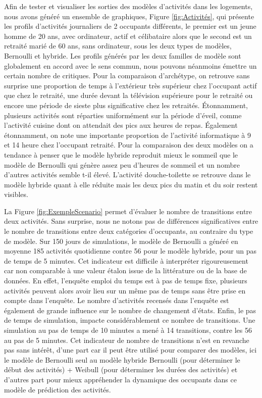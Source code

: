 Afin de tester et visualiser les sorties des modèles d'activités dans les logements, nous avons généré un ensemble de graphiques, Figure \ref{fig:Activités}, qui présente les profils d'activités journaliers de 2 occupants différents, le premier est un jeune homme de 20 ans, avec ordinateur, actif et célibataire alors que le second est un retraité marié de 60 ans, sans ordinateur, sous les deux types de modèles, Bernoulli et hybride. Les profils générés par les deux familles de modèle sont globalement en accord avec le sens commun, nous pouvons néanmoins émettre un certain nombre de critiques. Pour la comparaison d'archétype, on retrouve sans surprise une proportion de temps à l'extérieur très supérieur chez l'occupant actif que chez le retraité, une durée devant la télévision supérieure pour le retraité ou encore une période de sieste plus significative chez les retraités. Étonnamment, plusieurs activités sont réparties uniformément sur la période d'éveil, comme l'activité cuisine dont on attendait des pics aux heures de repas. Également étonnamment, on note une importante proportion de l'activité informatique à 9 et 14 heure chez l'occupant retraité. Pour la comparaison des deux modèles on a tendance à penser que le modèle hybride reproduit mieux le sommeil que le modèle de Bernoulli qui génère assez peu d'heures de sommeil et un nombre d'autres activités semble t-il élevé. L'activité douche-toilette se retrouve dans le modèle hybride quant à elle réduite mais les deux pics du matin et du soir restent visibles.

La Figure \ref{fig:ExempleScenario} permet d'évaluer le nombre de transitions entre deux activités. Sans surprise, nous ne notons pas de différences significatives entre le nombre de transitions entre deux catégories d'occupants, au contraire du type de modèle. Sur 150 jours de simulations, le modèle de Bernoulli a généré en moyenne 185 activités quotidienne contre 56 pour le modèle hybride, pour un pas de temps de 5 minutes. Cet indicateur est difficile à interpréter rigoureusement car non comparable à une valeur étalon issue de la littérature ou de la base de données. En effet, l'enquête emploi du temps est à pas de temps fixe, plusieurs activités peuvent alors avoir lieu sur un même pas de temps sans être prise en compte dans l'enquête. Le nombre d'activités recensés dans l'enquête est également de grande influence sur le nombre de changement d'états. Enfin, le pas de temps de simulation, impacte considérablement ce nombre de transitions. Une simulation au pas de temps de 10 minutes a mené à 14 transitions, contre les 56 au pas de 5 minutes. Cet indicateur de nombre de transitions n'est en revanche pas sans intérêt, d'une part car il peut être utilisé pour comparer des modèles, ici le modèle de Bernoulli seul au modèle hybride Bernoulli (pour déterminer le début des activités) + Weibull (pour déterminer les durées des activités) et d'autres part pour mieux appréhender la dynamique des occupants dans ce modèle de prédiction des activités.

